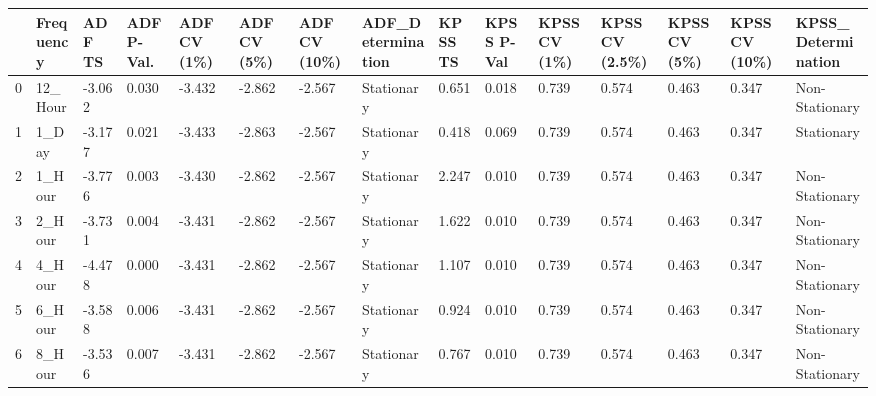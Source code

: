 \begin{tabular}{lllllllllllllll}
\toprule
 & Frequency & ADF TS & ADF P-Val. & ADF CV (1\%) & ADF CV (5\%) & ADF CV (10\%) & ADF_Determination & KPSS TS & KPSS P-Val & KPSS CV (1\%) & KPSS CV (2.5\%) & KPSS CV (5\%) & KPSS CV (10\%) & KPSS_Determination \\
\midrule
0 & 12_Hour & -3.062 & 0.030 & -3.432 & -2.862 & -2.567 & Stationary & 0.651 & 0.018 & 0.739 & 0.574 & 0.463 & 0.347 & Non-Stationary \\
1 & 1_Day & -3.177 & 0.021 & -3.433 & -2.863 & -2.567 & Stationary & 0.418 & 0.069 & 0.739 & 0.574 & 0.463 & 0.347 & Stationary \\
2 & 1_Hour & -3.776 & 0.003 & -3.430 & -2.862 & -2.567 & Stationary & 2.247 & 0.010 & 0.739 & 0.574 & 0.463 & 0.347 & Non-Stationary \\
3 & 2_Hour & -3.731 & 0.004 & -3.431 & -2.862 & -2.567 & Stationary & 1.622 & 0.010 & 0.739 & 0.574 & 0.463 & 0.347 & Non-Stationary \\
4 & 4_Hour & -4.478 & 0.000 & -3.431 & -2.862 & -2.567 & Stationary & 1.107 & 0.010 & 0.739 & 0.574 & 0.463 & 0.347 & Non-Stationary \\
5 & 6_Hour & -3.588 & 0.006 & -3.431 & -2.862 & -2.567 & Stationary & 0.924 & 0.010 & 0.739 & 0.574 & 0.463 & 0.347 & Non-Stationary \\
6 & 8_Hour & -3.536 & 0.007 & -3.431 & -2.862 & -2.567 & Stationary & 0.767 & 0.010 & 0.739 & 0.574 & 0.463 & 0.347 & Non-Stationary \\
\bottomrule
\end{tabular}

